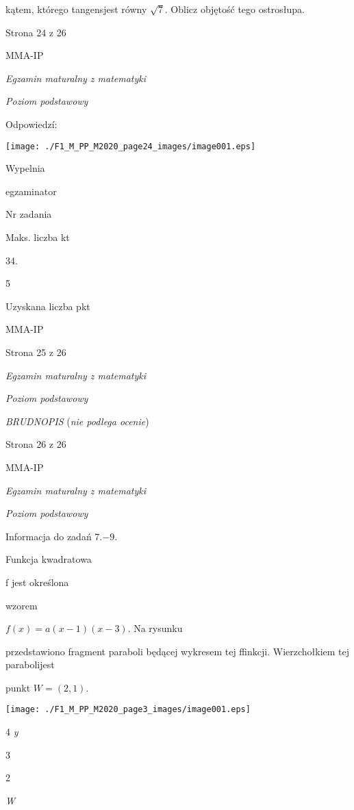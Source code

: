 \documentclass[a4paper,12pt]{article}
\begin{document}
kątem, którego tangensjest równy $\sqrt{7}$. Oblicz objętość tego ostrosłupa.

Strona 24 z 26

MMA-IP





{\it Egzamin maturalny z matematyki}

{\it Poziom podstawowy}

Odpowiedzí:
\begin{center}
\texttt{[image: ./F1\_M\_PP\_M2020\_page24\_images/image001.eps]}
\end{center}
Wypelnia

egzaminator

Nr zadania

Maks. liczba kt

34.

5

Uzyskana liczba pkt

MMA-IP

Strona 25 z 26





{\it Egzamin maturalny z matematyki}

{\it Poziom podstawowy}

{\it BRUDNOPIS} ({\it nie podlega ocenie})

Strona 26 z 26

MMA-IP





{\it Egzamin maturalny z matematyki}

{\it Poziom podstawowy}

Informacja do zadań 7.$-9.$

Funkcja kwadratowa

f jest określona

wzorem

$f(x)=a(x-1)(x-3)$. Na rysunku

przedstawiono fragment paraboli będącej wykresem tej ffinkcji. Wierzchołkiem tej parabolijest

punkt $W=(2,1).$
\begin{center}
\texttt{[image: ./F1\_M\_PP\_M2020\_page3\_images/image001.eps]}
\end{center}
4  {\it y}

3

2

{\it W}
\end{document}
